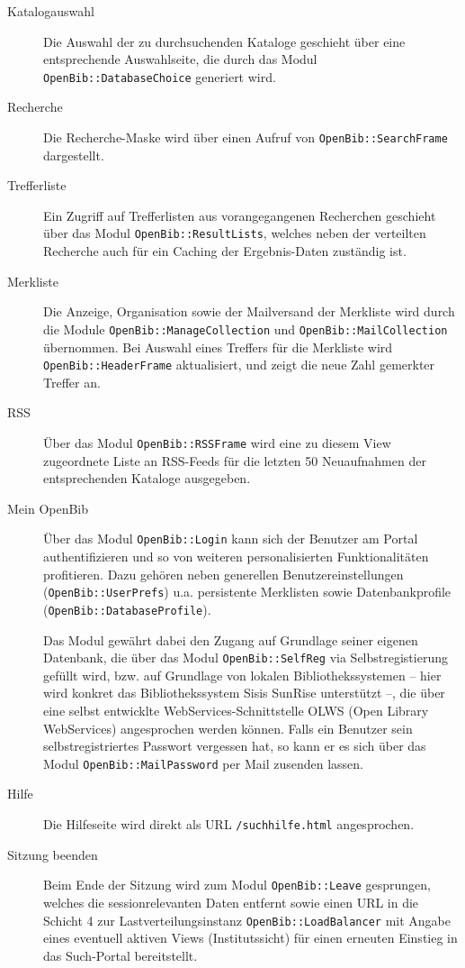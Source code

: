 \documentclass[11pt, twoside, a4paper, BCOR8mm, DIV12, bibtotoc,idxtotoc]{scrbook}
\begin{document}
\begin{description}
\item[Katalogauswahl] Die Auswahl der zu durchsuchenden Kataloge geschieht
  über eine entsprechende Aus\-wahl\-seite, die durch das Modul
  \texttt{OpenBib::DatabaseChoice} generiert wird.
\item[Recherche] Die Recherche-Maske wird über einen Aufruf von
  \texttt{OpenBib::SearchFrame} dargestellt.
\item[Trefferliste] Ein Zugriff auf Trefferlisten aus vorangegangenen
  Recherchen geschieht über das Modul \texttt{OpenBib::ResultLists},
  welches neben der verteilten Recherche auch für ein Caching der
  Ergebnis-Daten zuständig ist.
\item[Merkliste] Die Anzeige, Organisation sowie der Mailversand der
  Merkliste wird durch die Module
  \texttt{OpenBib::ManageCollection} und \texttt{OpenBib::MailCollection}
  über\-nom\-men. Bei Auswahl eines Treffers für die Merkliste wird
  \texttt{OpenBib::HeaderFrame} aktualisiert, und zeigt die neue Zahl
  gemerkter Treffer an.
\item[RSS] Über das Modul \texttt{OpenBib::RSSFrame} wird eine zu
  diesem View zugeordnete Liste an RSS-Feeds für die letzten 50
  Neuaufnahmen der entsprechenden Kataloge ausgegeben.
\item[Mein OpenBib] Über das Modul \texttt{OpenBib::Login}
  kann sich der Benutzer am Portal authentifizieren und so von
  weiteren personalisierten Funktionalitäten profitieren. Dazu
  gehören neben generellen Benutzereinstellungen
  (\texttt{OpenBib::UserPrefs}) u.a. per\-sis\-ten\-te Merklisten sowie
  Datenbankprofile (\texttt{OpenBib::DatabaseProfile}).

  Das Modul gewährt dabei den Zugang auf Grundlage seiner eigenen
  Datenbank, die über das Modul \texttt{OpenBib::SelfReg} via
  Selbstregistierung gefüllt wird, bzw. auf Grundlage von lokalen
  Bibliothekssystemen -- hier wird konkret das Bibliothekssystem Sisis
  SunRise unterstützt --, die über eine selbst entwicklte
  WebServices-Schnittstelle OLWS (Open Library WebServices)
  angesprochen werden können. Falls ein Benutzer sein
  selbstregistriertes Passwort vergessen hat, so kann er es sich über
  das Modul \texttt{OpenBib::MailPassword} per Mail zusenden lassen.
\item[Hilfe] Die Hilfeseite wird direkt als URL
  \texttt{/suchhilfe.html} angesprochen.
\item[Sitzung beenden] Beim Ende der Sitzung wird zum Modul
  \texttt{OpenBib::Leave} gesprungen, welches die sessionrelevanten Daten
  entfernt sowie einen URL in die Schicht 4 zur Lastver\-teilungs\-instanz
  \texttt{OpenBib::LoadBalancer} mit Angabe eines eventuell aktiven Views
  (Institutssicht) für einen er\-neu\-ten Einstieg in das Such-Portal
  bereitstellt.

\end{description}
\end{document}
